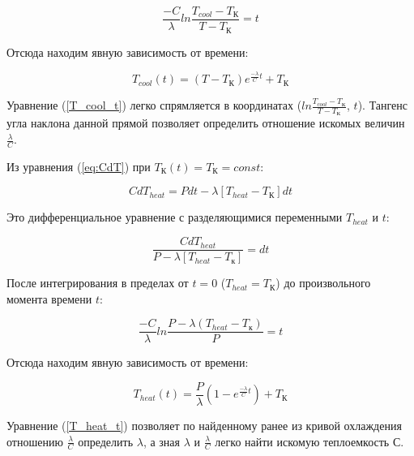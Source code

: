 \begin{equation}
    \frac{-C}{\lambda} ln \frac{T_{cool} - T_\text{К}}{T - T_\text{К}} = t
    \label{eq:diff_integral}
\end{equation}

Отсюда находим явную зависимость от времени:

\begin{equation}
    T_{cool}(t) = (T - T_\text{К}) e^{\frac{- \lambda}{C} t} + T_\text{К}
    \label{T_cool_t}
\end{equation}

Уравнение (\ref{T_cool_t}) легко спрямляется в координатах ($ln \frac{T_{cool} - T_\text{К}}{T - T_\text{К}}$, $t$). Тангенс угла наклона данной прямой позволяет определить отношение искомых величин $\frac{\lambda}{C}$.

Из уравнения (\ref{eq:CdT}) при $T_\text{К}(t) = T_\text{К} = const$:

\begin{equation}
    C dT_{heat} = P dt - \lambda \left[ T_{heat} - T_\text{К} \right] dt
    \label{C_dT_heat}
\end{equation}

Это дифференциальное уравнение с разделяющимися переменными $T_{heat}$ и $t$:

\begin{equation}
    \frac{C dT_{heat}}{P - \lambda \left[ T_{heat} - T_{к} \right]} = dt
    \label{eq:diff2}
\end{equation}

После интегрирования в пределах от $t = 0$ ($T_{heat} = T_\text{К}$) до произвольного момента времени $t$:

\begin{equation}
    \frac{-C}{\lambda} ln \frac{P - \lambda (T_{heat} - T_{к})}{P} = t
    \label{eq:diff_integral2}
\end{equation}

Отсюда находим явную зависимость от времени:

\begin{equation}
    T_{heat}(t) = \frac{P}{\lambda} (1 - e^{\frac{-\lambda}{C} t}) + T_\text{К}
    \label{T_heat_t}
\end{equation}

Уравнение (\ref{T_heat_t}) позволяет по найденному ранее из кривой охлаждения отношению $\frac{\lambda}{C}$ определить $\lambda$, а зная $\lambda$ и $\frac{\lambda}{C}$ легко найти искомую теплоемкость $С$.

